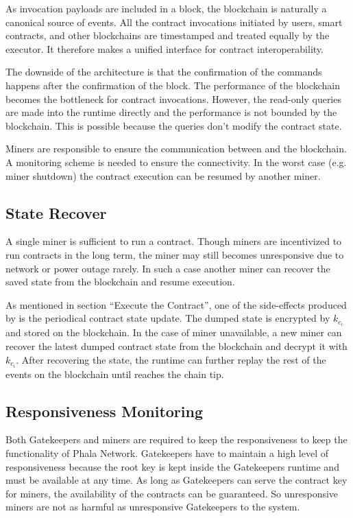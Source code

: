 As invocation payloads are included in a block, the blockchain is naturally a canonical source of events. All the contract invocations initiated by users, smart contracts, and other blockchains are timestamped and treated equally by the executor. It therefore makes a unified interface for contract interoperability.

The downside of the architecture is that the confirmation of the commands happens after the confirmation of the block. The performance of the blockchain becomes the bottleneck for contract invocations. However, the read-only queries are made into the runtime directly and the performance is not bounded by the blockchain. This is possible because the queries don't modify the contract state.

Miners are responsible to ensure the communication between \pruntime and the blockchain. A monitoring scheme is needed to ensure the connectivity. In the worst case (e.g.\,miner shutdown) the contract execution can be resumed by another miner.

\subsection{State Recover}

A single miner is sufficient to run a contract. Though miners are incentivized to run contracts in the long term, the miner may still becomes unresponsive due to network or power outage rarely. In such a case another miner can recover the saved state from the blockchain and resume execution.

As mentioned in section ``Execute the Contract'', one of the side-effects produced by \pruntime is the periodical contract state update. The dumped state is encrypted by $k_{c_i}$ and stored on the blockchain. In the case of miner unavailable, a new miner can recover the latest dumped contract state from the blockchain and decrypt it with $k_{c_i}$. After recovering the state, the runtime can further replay the rest of the events on the blockchain until reaches the chain tip.

\subsection{Responsiveness Monitoring}

Both Gatekeepers and miners are required to keep the responsiveness to keep the functionality of Phala Network. Gatekeepers have to maintain a high level of responsiveness because the root key is kept inside the Gatekeepers runtime and must be available at any time. As long as Gatekeepers can serve the contract key for miners, the availability of the contracts can be guaranteed. So unresponsive miners are not as harmful as unresponsive Gatekeepers to the system.


